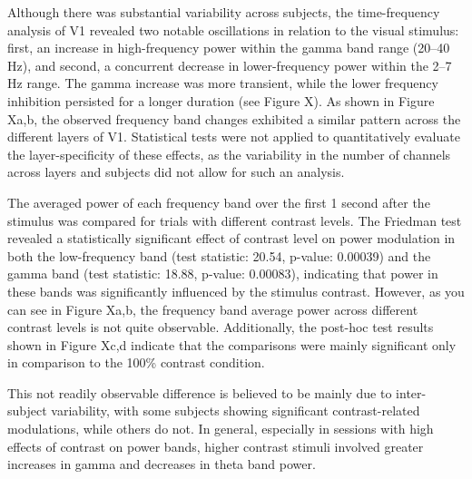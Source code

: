 \documentclass[
  letterpaper,
  DIV=11,
  numbers=noendperiod]{scrartcl}
\begin{document}
Although there was substantial variability across subjects, the
time-frequency analysis of V1 revealed two notable oscillations in
relation to the visual stimulus: first, an increase in high-frequency
power within the gamma band range (20--40 Hz), and second, a concurrent
decrease in lower-frequency power within the 2--7 Hz range. The gamma
increase was more transient, while the lower frequency inhibition
persisted for a longer duration (see Figure X). As shown in Figure Xa,b,
the observed frequency band changes exhibited a similar pattern across
the different layers of V1. Statistical tests were not applied to
quantitatively evaluate the layer-specificity of these effects, as the
variability in the number of channels across layers and subjects did not
allow for such an analysis.

The averaged power of each frequency band over the first 1 second after
the stimulus was compared for trials with different contrast levels. The
Friedman test revealed a statistically significant effect of contrast
level on power modulation in both the low-frequency band (test
statistic: 20.54, p-value: 0.00039) and the gamma band (test statistic:
18.88, p-value: 0.00083), indicating that power in these bands was
significantly influenced by the stimulus contrast. However, as you can
see in Figure Xa,b, the frequency band average power across different
contrast levels is not quite observable. Additionally, the post-hoc test
results shown in Figure Xc,d indicate that the comparisons were mainly
significant only in comparison to the 100\% contrast condition.

This not readily observable difference is believed to be mainly due to
inter-subject variability, with some subjects showing significant
contrast-related modulations, while others do not. In general,
especially in sessions with high effects of contrast on power bands,
higher contrast stimuli involved greater increases in gamma and
decreases in theta band power.
\end{document}
